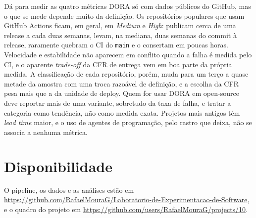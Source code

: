 \documentclass[12pt]{article}
\begin{document}
Dá para medir as quatro métricas DORA só com dados públicos do GitHub, mas o que se mede depende
muito da definição. Os repositórios populares que usam GitHub Actions ficam, em geral, em
\textit{Medium} e \textit{High}: publicam cerca de uma release a cada duas semanas, levam, na
mediana, duas semanas do commit à release, raramente quebram o CI do \texttt{main} e o consertam em poucas
horas. Velocidade e estabilidade não aparecem em conflito quando a falha é medida pelo CI, e o
aparente \textit{trade-off} da CFR de entrega vem em boa parte da própria medida. A classificação de
cada repositório, porém, muda para um terço a quase metade da amostra com uma troca razoável de definição, e
a escolha da CFR pesa mais que a da unidade de deploy. Quem for usar DORA em open-source deve
reportar mais de uma variante, sobretudo da taxa de falha, e tratar a categoria como tendência, não
como medida exata. Projetos mais antigos têm \textit{lead time} maior, e o uso de agentes de
programação, pelo rastro que deixa, não se associa a nenhuma métrica.

\section{Disponibilidade}

O pipeline, os dados e as análises estão em
\url{https://github.com/RafaelMouraG/Laboratorio-de-Experimentacao-de-Software}, e o quadro do projeto
em \url{https://github.com/users/RafaelMouraG/projects/10}.



\end{document}
